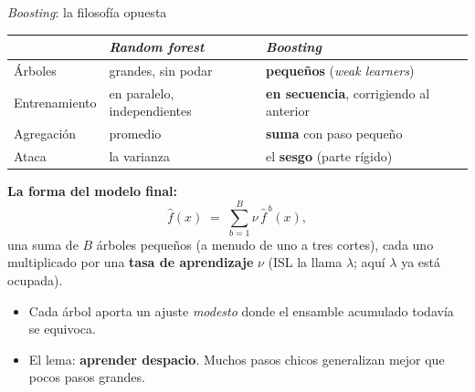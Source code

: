 \documentclass{beamer}
\newcommand{\1}{\mathbb{I}}
\begin{document}
\begin{frame}{\emph{Boosting}: la filosofía opuesta}
\small
\begin{center}
\footnotesize
\setlength{\tabcolsep}{4pt}
\begin{tabular}{lll}
\hline
 & \emph{Random forest} & \emph{Boosting} \\
\hline
Árboles & grandes, sin podar & \textbf{pequeños} (\emph{weak learners}) \\
Entrenamiento & en paralelo, independientes & \textbf{en secuencia}, corrigiendo al anterior \\
Agregación & promedio & \textbf{suma} con paso pequeño \\
Ataca & la varianza & el \textbf{sesgo} (parte rígido) \\
\hline
\end{tabular}
\end{center}
\pause
\vspace{0.15cm}
\textbf{La forma del modelo final:}
\[ \hat{f}(x) \;=\; \sum_{b=1}^{B} \nu \, \hat{f}^{\,b}(x), \]
una suma de $B$ árboles pequeños (a menudo de uno a tres cortes), cada uno multiplicado por una \textbf{tasa de aprendizaje} $\nu$ (ISL la llama $\lambda$; aquí $\lambda$ ya está ocupada).
\pause
\vspace{0.1cm}
\begin{itemize}\itemsep2pt
  \item Cada árbol aporta un ajuste \emph{modesto} donde el ensamble acumulado todavía se equivoca.
  \item El lema: \textbf{aprender despacio}. Muchos pasos chicos generalizan mejor que pocos pasos grandes.
\end{itemize}
\end{frame}
\end{document}
